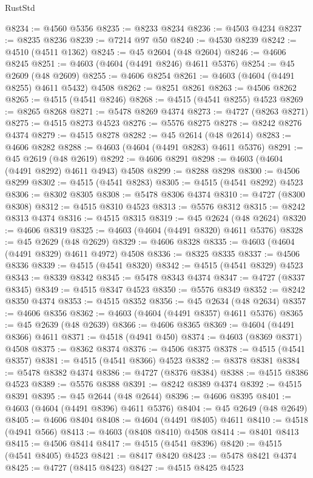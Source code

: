 \begin{lexlean}{RustStd}
\begin{coremodule}
@8234 := @4560 @5356
@8235 := @8233 @8234
@8236 := @4503 @4234
@8237 := @8235 @8236
@8239 := @7214 @97 @50
@8240 := @4530 @8239
@8242 := @4510 (@4511 @1362)
@8245 := @45 @2604 (@48 @2604)
@8246 := @4606 @8245
@8251 := @4603 (@4604 (@4491 @8246) @4611 @5376)
@8254 := @45 @2609 (@48 @2609)
@8255 := @4606 @8254
@8261 := @4603 (@4604 (@4491 @8255) @4611 @5432) @4508
@8262 := @8251 @8261
@8263 := @4506 @8262
@8265 := @4515 (@4541 @8246)
@8268 := @4515 (@4541 @8255) @4523
@8269 := @8265 @8268
@8271 := @5478 @8269 @4374
@8273 := @4727 (@8263 @8271)
@8275 := @4515 @8273 @4523
@8276 := @5576 @8275
@8278 := @8242 @8276 @4374
@8279 := @4515 @8278
@8282 := @45 @2614 (@48 @2614)
@8283 := @4606 @8282
@8288 := @4603 (@4604 (@4491 @8283) @4611 @5376)
@8291 := @45 @2619 (@48 @2619)
@8292 := @4606 @8291
@8298 := @4603 (@4604 (@4491 @8292) @4611 @4943) @4508
@8299 := @8288 @8298
@8300 := @4506 @8299
@8302 := @4515 (@4541 @8283)
@8305 := @4515 (@4541 @8292) @4523
@8306 := @8302 @8305
@8308 := @5478 @8306 @4374
@8310 := @4727 (@8300 @8308)
@8312 := @4515 @8310 @4523
@8313 := @5576 @8312
@8315 := @8242 @8313 @4374
@8316 := @4515 @8315
@8319 := @45 @2624 (@48 @2624)
@8320 := @4606 @8319
@8325 := @4603 (@4604 (@4491 @8320) @4611 @5376)
@8328 := @45 @2629 (@48 @2629)
@8329 := @4606 @8328
@8335 := @4603 (@4604 (@4491 @8329) @4611 @4972) @4508
@8336 := @8325 @8335
@8337 := @4506 @8336
@8339 := @4515 (@4541 @8320)
@8342 := @4515 (@4541 @8329) @4523
@8343 := @8339 @8342
@8345 := @5478 @8343 @4374
@8347 := @4727 (@8337 @8345)
@8349 := @4515 @8347 @4523
@8350 := @5576 @8349
@8352 := @8242 @8350 @4374
@8353 := @4515 @8352
@8356 := @45 @2634 (@48 @2634)
@8357 := @4606 @8356
@8362 := @4603 (@4604 (@4491 @8357) @4611 @5376)
@8365 := @45 @2639 (@48 @2639)
@8366 := @4606 @8365
@8369 := @4604 (@4491 @8366) @4611
@8371 := @4518 (@4941 @450)
@8374 := @4603 (@8369 @8371) @4508
@8375 := @8362 @8374
@8376 := @4506 @8375
@8378 := @4515 (@4541 @8357)
@8381 := @4515 (@4541 @8366) @4523
@8382 := @8378 @8381
@8384 := @5478 @8382 @4374
@8386 := @4727 (@8376 @8384)
@8388 := @4515 @8386 @4523
@8389 := @5576 @8388
@8391 := @8242 @8389 @4374
@8392 := @4515 @8391
@8395 := @45 @2644 (@48 @2644)
@8396 := @4606 @8395
@8401 := @4603 (@4604 (@4491 @8396) @4611 @5376)
@8404 := @45 @2649 (@48 @2649)
@8405 := @4606 @8404
@8408 := @4604 (@4491 @8405) @4611
@8410 := @4518 (@4941 @566)
@8413 := @4603 (@8408 @8410) @4508
@8414 := @8401 @8413
@8415 := @4506 @8414
@8417 := @4515 (@4541 @8396)
@8420 := @4515 (@4541 @8405) @4523
@8421 := @8417 @8420
@8423 := @5478 @8421 @4374
@8425 := @4727 (@8415 @8423)
@8427 := @4515 @8425 @4523

\end{coremodule}
\end{lexlean}
